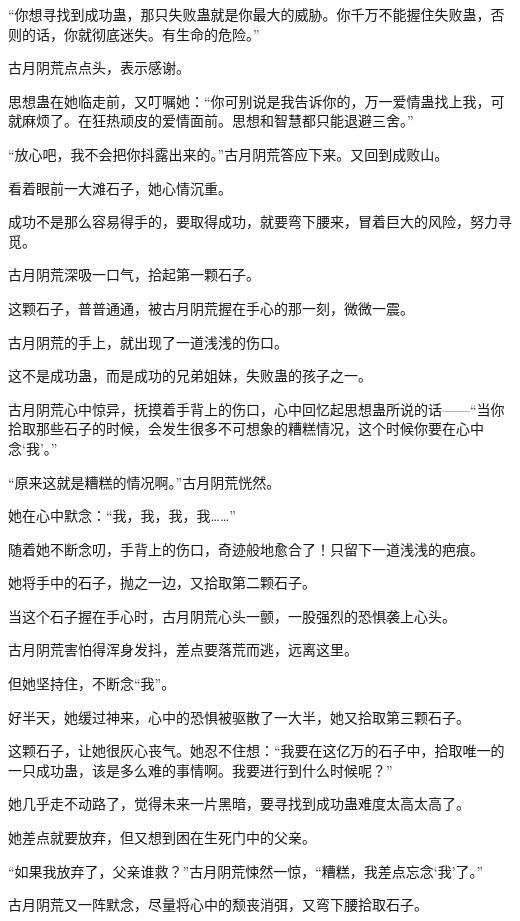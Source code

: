 \begin{this_body}
“你想寻找到成功蛊，那只失败蛊就是你最大的威胁。你千万不能握住失败蛊，否则的话，你就彻底迷失。有生命的危险。”

古月阴荒点点头，表示感谢。

思想蛊在她临走前，又叮嘱她：“你可别说是我告诉你的，万一爱情蛊找上我，可就麻烦了。在狂热顽皮的爱情面前。思想和智慧都只能退避三舍。”

“放心吧，我不会把你抖露出来的。”古月阴荒答应下来。又回到成败山。

看着眼前一大滩石子，她心情沉重。

成功不是那么容易得手的，要取得成功，就要弯下腰来，冒着巨大的风险，努力寻觅。

古月阴荒深吸一口气，拾起第一颗石子。

这颗石子，普普通通，被古月阴荒握在手心的那一刻，微微一震。

古月阴荒的手上，就出现了一道浅浅的伤口。

这不是成功蛊，而是成功的兄弟姐妹，失败蛊的孩子之一。

古月阴荒心中惊异，抚摸着手背上的伤口，心中回忆起思想蛊所说的话——“当你拾取那些石子的时候，会发生很多不可想象的糟糕情况，这个时候你要在心中念‘我’。”

“原来这就是糟糕的情况啊。”古月阴荒恍然。

她在心中默念：“我，我，我，我……”

随着她不断念叨，手背上的伤口，奇迹般地愈合了！只留下一道浅浅的疤痕。

她将手中的石子，抛之一边，又拾取第二颗石子。

当这个石子握在手心时，古月阴荒心头一颤，一股强烈的恐惧袭上心头。

古月阴荒害怕得浑身发抖，差点要落荒而逃，远离这里。

但她坚持住，不断念“我”。

好半天，她缓过神来，心中的恐惧被驱散了一大半，她又拾取第三颗石子。

这颗石子，让她很灰心丧气。她忍不住想：“我要在这亿万的石子中，拾取唯一的一只成功蛊，该是多么难的事情啊。我要进行到什么时候呢？”

她几乎走不动路了，觉得未来一片黑暗，要寻找到成功蛊难度太高太高了。

她差点就要放弃，但又想到困在生死门中的父亲。

“如果我放弃了，父亲谁救？”古月阴荒悚然一惊，“糟糕，我差点忘念‘我’了。”

古月阴荒又一阵默念，尽量将心中的颓丧消弭，又弯下腰拾取石子。


\end{this_body}
